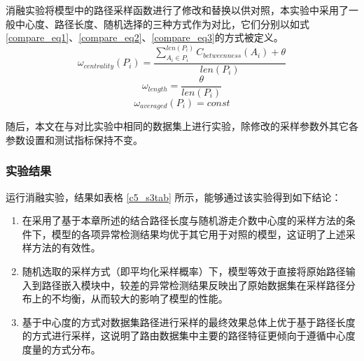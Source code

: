 消融实验将模型中的路径采样函数进行了修改和替换以供对照，本实验中采用了一般中心度、路径长度、随机选择的三种方式作为对比，它们分别以如式\ref{compare_eq1}、\ref{compare_eq2}、\ref{compare_eq3}的方式被定义。
\begin{equation} \label{compare_eq1}
\omega_{centrality}(P_i) = \frac{\sum_{A_i \in P_i}^{len(P_i)} C_{betweenness}(A_i) + \theta}{len(P_i)}
\end{equation}
\begin{equation} \label{compare_eq2}
\omega_{length} =  \frac{\theta}{len(P_i)}
\end{equation}
\begin{equation} \label{compare_eq3}
\omega_{averaged}(P_i) = const
\end{equation}

随后，本文在与对比实验中相同的数据集上进行实验，除修改的采样参数外其它各参数设置和测试指标保持不变。

\subsubsection{实验结果}

运行消融实验，结果如表格 \ref{c5_s3tab} 所示，能够通过该实验得到如下结论：

\begin{enumerate}
    \item 在采用了基于本章所述的结合路径长度与随机游走介数中心度的采样方法的条件下，模型的各项异常检测结果均优于其它用于对照的模型，这证明了上述采样方法的有效性。
    \item 随机选取的采样方式（即平均化采样概率）下，模型等效于直接将原始路径输入到路径嵌入模块中，较差的异常检测结果反映出了原始数据集在采样路径分布上的不均衡，从而较大的影响了模型的性能。
    \item 基于中心度的方式对数据集路径进行采样的最终效果总体上优于基于路径长度的方式进行采样，这说明了路由数据集中主要的路径特征更倾向于遵循中心度度量的方式分布。
\end{enumerate}

